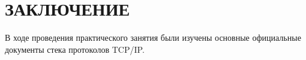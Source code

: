 \section*{ЗАКЛЮЧЕНИЕ}

В ходе проведения практического занятия были изучены основные официальные
документы стека протоколов TCP/IP.

\newpage